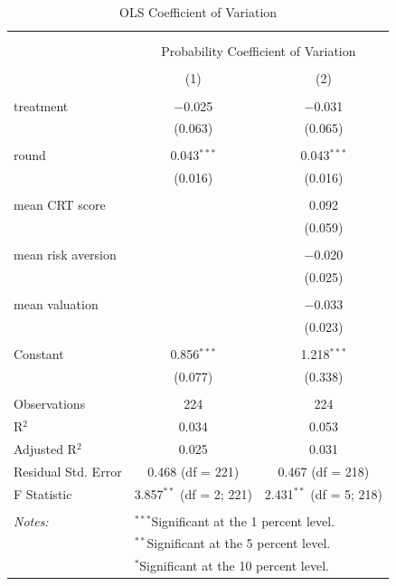 \begin{table}[!htbp] \centering 
  \caption{OLS Coefficient of Variation} 
  \label{tab:var_coeff_ols} 
\begin{tabular}{@{\extracolsep{5pt}}lcc} 
\\[-1.8ex]\hline 
\hline \\[-1.8ex] 
\\[-1.8ex] & \multicolumn{2}{c}{Probability Coefficient of Variation} \\ 
\\[-1.8ex] & (1) & (2)\\ 
\hline \\[-1.8ex] 
 treatment & $-$0.025 & $-$0.031 \\ 
  & (0.063) & (0.065) \\ 
  & & \\ 
 round & 0.043$^{***}$ & 0.043$^{***}$ \\ 
  & (0.016) & (0.016) \\ 
  & & \\ 
 mean CRT score &  & 0.092 \\ 
  &  & (0.059) \\ 
  & & \\ 
 mean risk aversion &  & $-$0.020 \\ 
  &  & (0.025) \\ 
  & & \\ 
 mean valuation &  & $-$0.033 \\ 
  &  & (0.023) \\ 
  & & \\ 
 Constant & 0.856$^{***}$ & 1.218$^{***}$ \\ 
  & (0.077) & (0.338) \\ 
  & & \\
  \hline
Observations & 224 & 224 \\ 
R$^{2}$ & 0.034 & 0.053 \\ 
Adjusted R$^{2}$ & 0.025 & 0.031 \\ 
Residual Std. Error & 0.468 (df = 221) & 0.467 (df = 218) \\ 
F Statistic & 3.857$^{**}$ (df = 2; 221) & 2.431$^{**}$ (df = 5; 218) \\ 
\hline \\[-1.8ex] 
\textit{Notes:} & \multicolumn{2}{l}{$^{***}$Significant at the 1 percent level.} \\ 
 & \multicolumn{2}{l}{$^{**}$Significant at the 5 percent level.} \\ 
 & \multicolumn{2}{l}{$^{*}$Significant at the 10 percent level.} \\ 
\end{tabular} 
\end{table}

